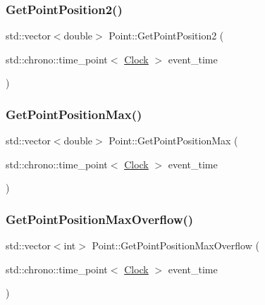 \mbox{\label{classPoint_a98557a7ad341f981b13bb009994868f2}} 
\subsubsection{\texorpdfstring{Get\+Point\+Position2()}{GetPointPosition2()}}
{\footnotesize\ttfamily std\+::vector$<$double$>$ Point\+::\+Get\+Point\+Position2 (\begin{DoxyParamCaption}\item[{std\+::chrono\+::time\+\_\+point$<$ \mbox{\hyperlink{universe_8h_a0ef8d951d1ca5ab3cfaf7ab4c7a6fd80}{Clock}} $>$}]{event\+\_\+time }\end{DoxyParamCaption})\hspace{0.3cm}{\ttfamily [inline]}}

\mbox{\label{classPoint_afca47c5ea265894faf7b6aa4f4b17998}} 
\subsubsection{\texorpdfstring{Get\+Point\+Position\+Max()}{GetPointPositionMax()}}
{\footnotesize\ttfamily std\+::vector$<$double$>$ Point\+::\+Get\+Point\+Position\+Max (\begin{DoxyParamCaption}\item[{std\+::chrono\+::time\+\_\+point$<$ \mbox{\hyperlink{universe_8h_a0ef8d951d1ca5ab3cfaf7ab4c7a6fd80}{Clock}} $>$}]{event\+\_\+time }\end{DoxyParamCaption})\hspace{0.3cm}{\ttfamily [inline]}}

\mbox{\label{classPoint_a228830fddb8b4d90e910e0774796e635}} 
\subsubsection{\texorpdfstring{Get\+Point\+Position\+Max\+Overflow()}{GetPointPositionMaxOverflow()}}
{\footnotesize\ttfamily std\+::vector$<$int$>$ Point\+::\+Get\+Point\+Position\+Max\+Overflow (\begin{DoxyParamCaption}\item[{std\+::chrono\+::time\+\_\+point$<$ \mbox{\hyperlink{universe_8h_a0ef8d951d1ca5ab3cfaf7ab4c7a6fd80}{Clock}} $>$}]{event\+\_\+time }\end{DoxyParamCaption})\hspace{0.3cm}{\ttfamily [inline]}}

